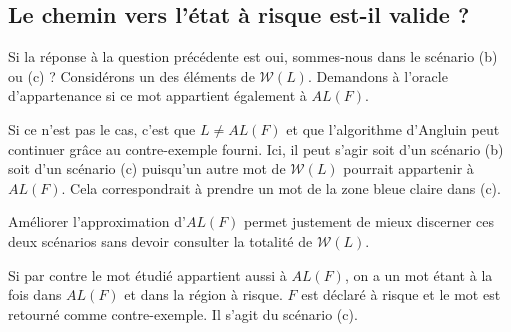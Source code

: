 \subsection{Le chemin vers l'état à risque est-il valide ?}

Si la réponse à la question précédente est oui, sommes-nous dans le scénario (b) ou (c) ?
Considérons un des éléments de $\mathcal{W}(L)$. Demandons à l'oracle d'appartenance si ce mot appartient également à $AL(F)$.

Si ce n'est pas le cas, c'est que $L\neq AL(F)$ et que l'algorithme d'Angluin peut continuer grâce au contre-exemple fourni. Ici, il peut s'agir soit d'un scénario (b) soit d'un scénario (c) puisqu'un autre mot de $\mathcal{W}(L)$ pourrait appartenir à $AL(F)$. Cela correspondrait à prendre un mot de la zone bleue claire dans (c).

Améliorer l'approximation d'$AL(F)$ permet justement de mieux discerner ces deux scénarios sans devoir consulter la totalité de $\mathcal{W}(L)$.

Si par contre le mot étudié appartient aussi à $AL(F)$, on a un mot étant à la fois dans $AL(F)$ et dans la région à risque. $F$ est déclaré à risque et le mot est retourné comme contre-exemple. Il s'agit du scénario (c).
